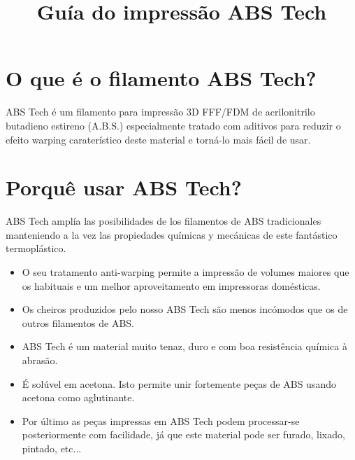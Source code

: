 \documentclass[11pt,a4paper]{article}
\title{Guía do impressão ABS Tech}
\date{}
\begin{document}

\section{﻿﻿O que é o filamento ABS Tech?}ABS Tech é um filamento para impressão 3D FFF/FDM de acrilonitrilo butadieno estireno (A.B.S.) especialmente tratado com aditivos para reduzir o efeito warping caraterístico deste material e torná-lo mais fácil de usar.
\section{Porquê usar ABS Tech?}
ABS Tech amplía las posibilidades de los filamentos de ABS tradicionales manteniendo a la vez las propiedades químicas y mecánicas de este fantástico termoplástico.
\begin{itemize}
\item O seu tratamento anti-warping permite a impressão de volumes maiores que os habituais e um melhor aproveitamento em impressoras domésticas.
\item Os cheiros produzidos pelo nosso ABS Tech são menos incómodos que os de outros filamentos de ABS.
\item ABS Tech é um material muito tenaz, duro e com boa resistência química à abrasão.
\item É solúvel em acetona. Isto permite unir fortemente peças de ABS usando acetona como aglutinante.
\item Por último as peças impressas em ABS Tech podem processar-se posteriormente com facilidade, já que este material pode ser furado, lixado, pintado, etc...
\end{itemize}
\end{document}
